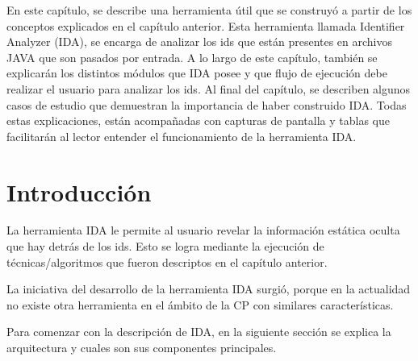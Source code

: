 
\fancyhf{}
\pagestyle{fancy}
\lhead[]{\leftmark}
\chead[]{}
\rhead[]{\thepage}
\renewcommand{\headrulewidth}{1pt}

En este capítulo, se describe una herramienta útil que se construyó a partir de los conceptos explicados en el capítulo anterior. Esta herramienta llamada Identifier Analyzer (IDA), se encarga de analizar los ids que están presentes en archivos JAVA que son pasados por entrada.
A lo largo de este capítulo, también se explicarán los distintos módulos que IDA posee y que flujo de ejecución debe realizar el usuario para analizar los ids. Al final del capítulo, se describen algunos casos de estudio que demuestran la importancia de haber construido IDA. Todas estas explicaciones, están acompañadas con capturas de pantalla y tablas que facilitarán al lector entender el funcionamiento de la herramienta IDA.

\section{Introducción}


La herramienta IDA le permite al usuario revelar la información estática oculta que hay detrás de los ids. Esto se logra mediante la ejecución de técnicas/algoritmos que fueron descriptos en el capítulo anterior.

La iniciativa del desarrollo de la herramienta IDA surgió, porque en la actualidad no existe otra herramienta en el ámbito de la CP con similares características.

Para comenzar con la descripción de IDA, en la siguiente sección se explica la arquitectura y cuales son sus componentes principales.





